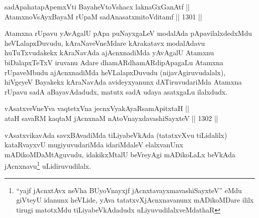 \begin{shl}
sadA\s pahatapApemxVti BayaheVtoVshacx laknaGxGanAtf ||  \\
AtamxnoV\s sAyx\footmotemark[2]BayaM rUpaM sadA\s nasatxmitoVditamf ||  1301 ||  
\end{shl}

\begin{artha}
Atamxna rUpavu yAvAgalU pApa puNayxgaLeV modalAda pApavilalxdedxMdu heVLalapxDuvudu, kAraNaveVneMdare kArakatavx modalAdavu huTuTxvudakekx kAraNavAda ajAcnxnadiMda yAvAgalU Atamxnu biDalapxTeTxV iruvanu Adare dhamARdhamARdipApagaLu Atamxna rUpaveMbudu ajAcnxnadiMda heVLalapxDuvudu (nijavAgiruvudalalx), hiVgeyeV Bayakekx kAraNavAda avideyxyanunx dATiruvudariMda Atamxna rUpavu sadA aBayavAdadudx, matutx sadA udaya asatxgaLu ilalxdudx.
\end{artha}


\begin{shl}
vAsatxveVneYva vaqtetxVna jecnxVyakAyaRsamApitxtaH || \\
ataH savaRM kaqtaM jAcnxnaM nAtoV\s nayxdavashiSayxteV ||  1302 ||  
\end{shl}

\begin{artha}
vAsatxvikavAda savxBAvadiMda tiLiyabeVkAda (tatatxvXvu tiLidalilx) kataRvayxvU mugiyuvudariMda idariMdaleV elalxvanUnx mADikoMDaMtAguvudu, idakikxMtalU beVreyAgi mADikoLaLx beVkAda jAcnxnavu\footnote{``yajf jAcnxtAvx neVha BUyoV\s nayxjf jAcnxtavayxmavashiSayxteV'' eMdu giVteyU idanunx heVLide, yAva tatatxvXjAcnxnavanunx mADikoMDare ililx tirugi matotxMdu tiLiyabeVkAdadudx uLiyuvudilalxveMdathaR} uLidiruvudilalx.
\end{artha}


